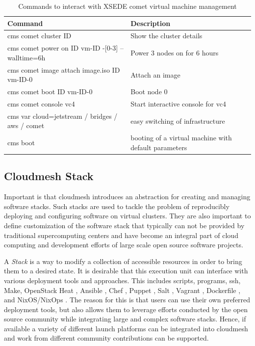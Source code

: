 
\begin{table}[htb]
\caption{Commands to interact with XSEDE comet virtual machine
  management}\label{T:comet}
\begin{center}
\begin{tabular}{|l|l|}
\hline
Command & Description\\
\hline
\hline
cms comet cluster  ID
  &  Show the cluster details \\
cms comet power on ID vm-ID -[0-3] --walltime=6h
  & Power 3 nodes on for 6 hours \\
cms comet image attach image.iso ID vm-ID-0
  &  Attach an image \\
cms comet boot ID vm-ID-0
  & Boot node 0 \\
cms comet console vc4
  & Start interactive console for vc4  \\
cms var cloud=jetstream / bridges / aws / comet
   & easy switching of infrastructure \\
cms boot
   & booting of a virtual machine with default parameters\\
\hline
\end{tabular}
\end{center}
\end{table}




\subsection{Cloudmesh Stack} 
\label{S:stacks}

Important is that cloudmesh introduces an abstraction for creating and
managing software stacks. Such stacks are used to tackle the problem
of reproducibly deploying and configuring software on virtual
clusters. They are also important to define customization of the
software stack that typically can not be provided by traditional
supercomputing centers and have become an integral part of cloud
computing and development efforts of large scale open source software
projects.


A {\it Stack} is a way to modify a collection of accessible resources
in order to bring them to a desired state. It is desirable that this
execution unit can interface with various deployment tools and
approaches. This includes scripts, programs, ssh, Make, OpenStack Heat
\cite{??}, Ansible \cite{??}, Chef \cite{??}, Puppet \cite{??}, Salt
\cite{??}, Vagrant \cite{??}, Dockerfile \cite{??}, and NixOS/NixOps
\cite{??}. The reason for this is that users can use their own
preferred deployment tools, but also allows them to leverage efforts
conducted by the open source community while integrating large and
complex software stacks.  Hence, if available a variety of different
launch platforms can be integrated into cloudmesh and work from
different community contributions can be supported.

